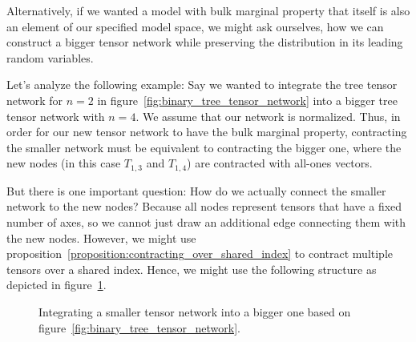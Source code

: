 \documentclass[../../main.tex]{subfiles}
\begin{document}
    Alternatively, if we wanted a model with bulk marginal property that itself is also an element of our specified model space, we might ask ourselves, how we can construct a bigger tensor network while preserving the distribution in its leading random variables.

    Let's analyze the following example: Say we wanted to integrate the tree tensor network for $n = 2$ in figure~\ref{fig:binary_tree_tensor_network} into a bigger tree tensor network with $n = 4$. We assume that our network is normalized. Thus, in order for our new tensor network to have the bulk marginal property, contracting the smaller network must be equivalent to contracting the bigger one, where the new nodes (in this case $T_{1,3}$ and $T_{1,4}$) are contracted with all-ones vectors.

    But there is one important question: How do we actually connect the smaller network to the new nodes? Because all nodes represent tensors that have a fixed number of axes, so we cannot just draw an additional edge connecting them with the new nodes. However, we might use proposition~\ref{proposition:contracting_over_shared_index} to contract multiple tensors over a shared index. Hence, we might use the following structure as depicted in figure~\ref{fig:integrating_tree_tensor_network}.

    \begin{figure}[h]
        \centering
        \caption{Integrating a smaller tensor network into a bigger one based on figure~\ref{fig:binary_tree_tensor_network}.}
        \label{fig:integrating_tree_tensor_network}
    \end{figure}
\end{document}
